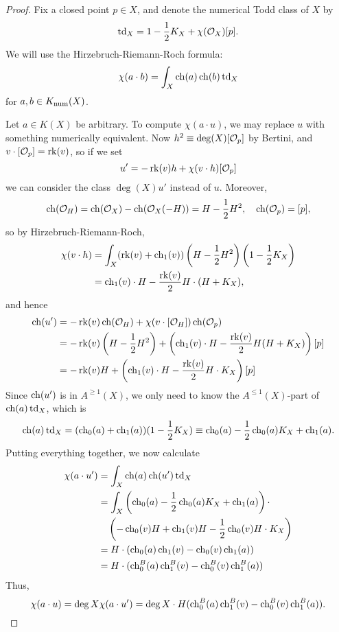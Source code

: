 \documentclass[letterpaper,12pt]{amsart}
\theoremstyle{remark}
\begin{document}
\begin{proof}
    Fix a closed point $p \in X$, and denote the numerical Todd class of $X$ by
    \[ \td_X = 1 - \frac{1}{2} K_X + \chi(\Oh_X) [p]. \]
    We will use the Hirzebruch-Riemann-Roch formula:
    \[ \chi(a \cdot b) = \int_X \ch(a) \ch(b) \td_X \]
    for $a, b \in \Kn(X)$.
    
    Let $a \in K(X)$ be arbitrary. To compute $\chi(a \cdot u)$, we may replace $u$ with something numerically equivalent. Now $h^2 \equiv \deg(X) [\Oh_p]$ by Bertini, and $v \cdot [\Oh_p] = \rk(v)$, so if we set
    \[ u' = - \rk(v) h + \chi(v \cdot h) [\Oh_p] \]
    we can consider the class $\deg(X) u'$ instead of $u$. Moreover, 
    \[ \ch(\Oh_H) = \ch(\Oh_X) - \ch(\Oh_X(-H)) = H - \frac{1}{2} H^2, \quad \ch(\Oh_p) = [p], \]
    so by Hirzebruch-Riemann-Roch,
    \begin{align*}
        \chi(v \cdot h) & = \int_X (\rk(v) + \ch_1(v))\left(H - \frac{1}{2}H^2\right)\left(1 - \frac{1}{2}K_X\right) \\
        & = \ch_1(v) \cdot H - \frac{\rk(v)}{2} H\cdot(H + K_X),
    \end{align*}
    and hence
    \begin{align*}
        \ch(u') & = -\rk(v) \ch(\Oh_H) + \chi(v \cdot [\Oh_H]) \ch(\Oh_p) \\
        & = -\rk(v)\left(H - \frac{1}{2}H^2\right) + \left(\ch_1(v) \cdot H - \frac{\rk(v)}{2} H(H + K_X)\right)[p] \\
        & = -\rk(v) H + \left(\ch_1(v) \cdot H - \frac{\rk(v)}{2} H \cdot K_X\right)[p]
    \end{align*}
    Since $\ch(u')$ is in $A^{\ge 1}(X)$, we only need to know the $A^{\le 1}(X)$-part of $\ch(a)\td_X$, which is
    \[ \ch(a) \td_X = (\ch_0(a) + \ch_1(a)) (1 - \frac{1}{2} K_X) \equiv \ch_0(a) - \frac{1}{2} \ch_0(a) K_X + \ch_1(a). \]
    Putting everything together, we now calculate
    \begin{align*}
        \chi(a \cdot u') & = \int_X \ch(a) \ch(u') \td_X \\
        & = \int_X \left(\ch_0(a) - \frac{1}{2} \ch_0(a) K_X + \ch_1(a)\right)\cdot  \\
        & \quad\left(-\ch_0(v) H + \ch_1(v) H - \frac{1}{2} \ch_0(v) H \cdot K_X\right) \\
        & = H \cdot (\ch_0(a) \ch_1(v) - \ch_0(v) \ch_1(a)) \\
        & = H \cdot (\ch^B_0(a) \ch^B_1(v) - \ch^B_0(v) \ch^B_1(a))
    \end{align*}
    Thus,
    \[ \chi(a \cdot u) = \deg X \chi(a \cdot u') = \deg X \cdot H (\ch^B_0(a) \ch^B_1(v) - \ch^B_0(v) \ch^B_1(a)). \]
    

\end{proof}
\end{document}
